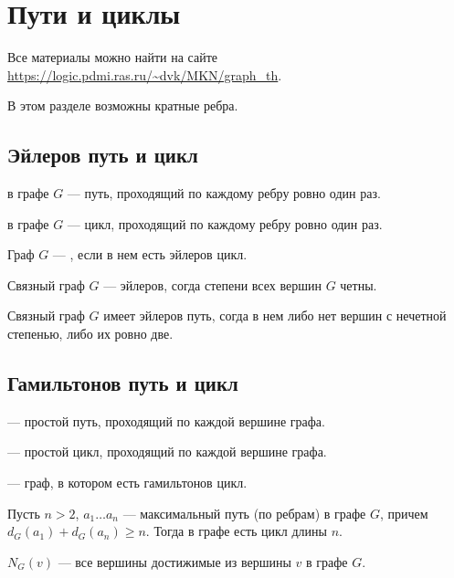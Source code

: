 \chapter{Пути и циклы} 

Все материалы можно найти на сайте \url{https://logic.pdmi.ras.ru/~dvk/MKN/graph_th}.
\begin{note}
    В этом разделе возможны кратные ребра.
\end{note}

\section{Эйлеров путь и цикл}

\begin{definition}[]

	 в графе $G$ --- путь, проходящий по каждому ребру ровно один раз. 
	
	 в графе $G$ --- цикл, проходящий по каждому ребру ровно один раз. 

	 Граф $G$ --- , если в нем есть эйлеров цикл.
\end{definition}

\begin{theorem}
	Связный граф $G$ --- эйлеров, согда степени всех вершин $G$ четны.
\end{theorem}
\begin{corollary}[]
	Связный граф $G$ имеет эйлеров путь, согда в нем либо нет вершин с нечетной степенью, либо их ровно две.
\end{corollary}

\section{Гамильтонов путь и цикл}

\begin{definition}[]
	 --- простой путь, проходящий по каждой вершине графа.

	 --- простой цикл, проходящий по каждой вершине графа.

	  --- граф, в котором есть гамильтонов цикл.
\end{definition}

\begin{lemma}\label{lm:circle_1}
    Пусть $n > 2$, $a_1 \ldots a_n$ --- максимальный путь (по ребрам) в графе $G$, причем $d_{G}(a_1) + d_{G}(a_{n}) \ge n$. Тогда в графе есть цикл длины $n$.
\end{lemma}
$N_G(v)$ --- все вершины достижимые из вершины $v$ в графе $G$.

